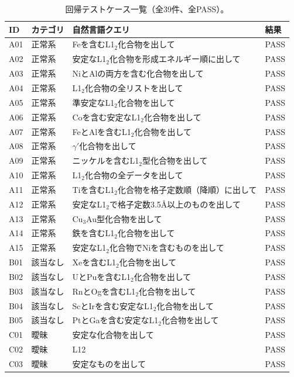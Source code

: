 \documentclass[5p,twocolumn]{elsarticle}
\begin{document}
\begin{table}[htbp]
\centering
\caption{回帰テストケース一覧（全39件、全PASS）。}
\label{tab:sup_all_tests}
\footnotesize
\begin{tabular}{llp{8cm}l}
  \toprule
  ID & カテゴリ & 自然言語クエリ & 結果 \\
  \midrule
  A01 & 正常系 & Feを含むL1$_2$化合物を出して & PASS \\
  A02 & 正常系 & 安定なL1$_2$化合物を形成エネルギー順に出して & PASS \\
  A03 & 正常系 & NiとAlの両方を含む化合物を出して & PASS \\
  A04 & 正常系 & L1$_2$化合物の全リストを出して & PASS \\
  A05 & 正常系 & 準安定なL1$_2$化合物を出して & PASS \\
  A06 & 正常系 & Coを含む安定なL1$_2$化合物を出して & PASS \\
  A07 & 正常系 & FeとAlを含むL1$_2$化合物を出して & PASS \\
  A08 & 正常系 & $\gamma'$化合物を出して & PASS \\
  A09 & 正常系 & ニッケルを含むL1$_2$型化合物を出して & PASS \\
  A10 & 正常系 & L1$_2$化合物の全データを出して & PASS \\
  A11 & 正常系 & Tiを含むL1$_2$化合物を格子定数順（降順）に出して & PASS \\
  A12 & 正常系 & 安定なL1$_2$で格子定数3.5\AA 以上のものを出して & PASS \\
  A13 & 正常系 & Cu$_3$Au型化合物を出して & PASS \\
  A14 & 正常系 & 鉄を含むL1$_2$化合物を出して & PASS \\
  A15 & 正常系 & 安定なL1$_2$化合物でNiを含むものを出して & PASS \\
  \midrule
  B01 & 該当なし & Xeを含むL1$_2$化合物を出して & PASS \\
  B02 & 該当なし & UとPuを含むL1$_2$化合物を出して & PASS \\
  B03 & 該当なし & RnとOgを含むL1$_2$化合物を出して & PASS \\
  B04 & 該当なし & ScとIrを含む安定なL1$_2$化合物を出して & PASS \\
  B05 & 該当なし & PtとGaを含む安定なL1$_2$化合物を出して & PASS \\
  \midrule
  C01 & 曖昧 & 安定な化合物を出して & PASS \\
  C02 & 曖昧 & L12 & PASS \\
  C03 & 曖昧 & 安定なものを出して & PASS \\

\end{tabular}
\end{table}
\end{document}
